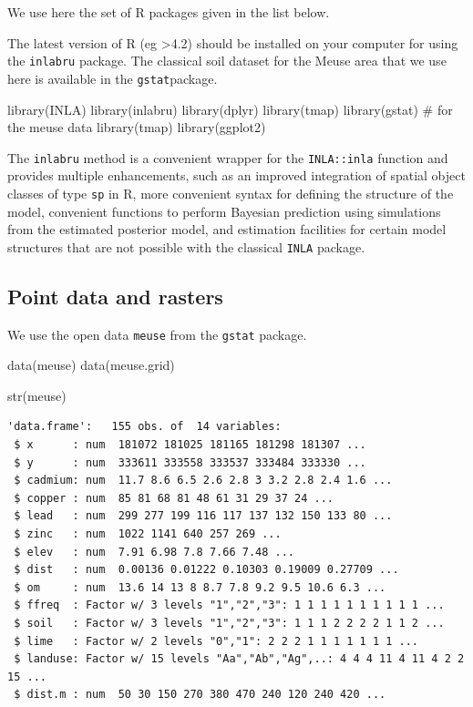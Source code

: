\documentclass[
  a4paper,
]{article}
\newenvironment{Shaded}{\begin{snugshade}}{\end{snugshade}}
\newcommand{\CommentTok}[1]{\textcolor[rgb]{0.37,0.37,0.37}{#1}}
\newcommand{\FunctionTok}[1]{\textcolor[rgb]{0.28,0.35,0.67}{#1}}
\newcommand{\NormalTok}[1]{\textcolor[rgb]{0.00,0.23,0.31}{#1}}
\begin{document}
We use here the set of R packages given in the list below.

The latest version of R (eg \textgreater4.2) should be installed on your
computer for using the \texttt{inlabru} package. The classical soil
dataset for the Meuse area that we use here is available in the
\texttt{gstat}package.

\begin{Shaded}
\begin{Highlighting}[]
\FunctionTok{library}\NormalTok{(INLA)}
\FunctionTok{library}\NormalTok{(inlabru)}
\FunctionTok{library}\NormalTok{(dplyr)}
\FunctionTok{library}\NormalTok{(tmap)}
\FunctionTok{library}\NormalTok{(gstat) }\CommentTok{\# for the meuse data}
\FunctionTok{library}\NormalTok{(tmap)}
\FunctionTok{library}\NormalTok{(ggplot2)}
\end{Highlighting}
\end{Shaded}

The \texttt{inlabru} method is a convenient wrapper for the
\texttt{INLA::inla} function and provides multiple enhancements, such as
an improved integration of spatial object classes of type \texttt{sp} in
R, more convenient syntax for defining the structure of the model,
convenient functions to perform Bayesian prediction using simulations
from the estimated posterior model, and estimation facilities for
certain model structures that are not possible with the classical
\texttt{INLA} package.

\hypertarget{point-data-and-rasters}{%
\subsection{Point data and rasters}\label{point-data-and-rasters}}

We use the open data \texttt{meuse} from the \texttt{gstat} package.

\begin{Shaded}
\begin{Highlighting}[]
\FunctionTok{data}\NormalTok{(meuse)}
\FunctionTok{data}\NormalTok{(meuse.grid)}

\FunctionTok{str}\NormalTok{(meuse)}
\end{Highlighting}
\end{Shaded}

\begin{verbatim}
'data.frame':   155 obs. of  14 variables:
 $ x      : num  181072 181025 181165 181298 181307 ...
 $ y      : num  333611 333558 333537 333484 333330 ...
 $ cadmium: num  11.7 8.6 6.5 2.6 2.8 3 3.2 2.8 2.4 1.6 ...
 $ copper : num  85 81 68 81 48 61 31 29 37 24 ...
 $ lead   : num  299 277 199 116 117 137 132 150 133 80 ...
 $ zinc   : num  1022 1141 640 257 269 ...
 $ elev   : num  7.91 6.98 7.8 7.66 7.48 ...
 $ dist   : num  0.00136 0.01222 0.10303 0.19009 0.27709 ...
 $ om     : num  13.6 14 13 8 8.7 7.8 9.2 9.5 10.6 6.3 ...
 $ ffreq  : Factor w/ 3 levels "1","2","3": 1 1 1 1 1 1 1 1 1 1 ...
 $ soil   : Factor w/ 3 levels "1","2","3": 1 1 1 2 2 2 2 1 1 2 ...
 $ lime   : Factor w/ 2 levels "0","1": 2 2 2 1 1 1 1 1 1 1 ...
 $ landuse: Factor w/ 15 levels "Aa","Ab","Ag",..: 4 4 4 11 4 11 4 2 2 15 ...
 $ dist.m : num  50 30 150 270 380 470 240 120 240 420 ...
\end{verbatim}
\end{document}
